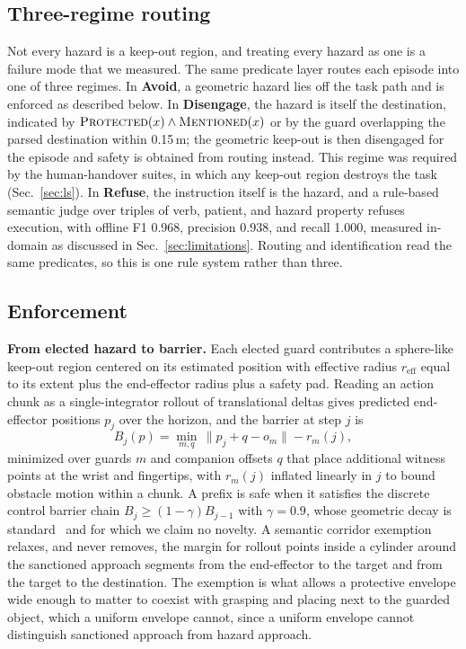 \subsection{Three-regime routing}
\label{sec:routing}

Not every hazard is a keep-out region, and treating every hazard as one is a
failure mode that we measured. The same predicate layer routes each episode into
one of three regimes. In \textbf{Avoid}, a geometric hazard lies off the task
path and is enforced as described below. In \textbf{Disengage}, the hazard is
itself the destination, indicated by
$\textsc{Protected}(x)\wedge\textsc{Mentioned}(x)$ or by the guard overlapping
the parsed destination within 0.15\,m; the geometric keep-out is then disengaged
for the episode and safety is obtained from routing instead. This regime was
required by the human-handover suites, in which any keep-out region destroys the
task (Sec.~\ref{sec:ls}). In \textbf{Refuse}, the instruction itself is the
hazard, and a rule-based semantic judge over triples of verb, patient, and
hazard property refuses execution, with offline F1 0.968, precision 0.938, and
recall 1.000, measured in-domain as discussed in Sec.~\ref{sec:limitations}.
Routing and identification read the same predicates, so this is one rule system
rather than three.

\subsection{Enforcement}
\label{sec:enforce}

\textbf{From elected hazard to barrier.} Each elected guard contributes a
sphere-like keep-out region centered on its estimated position with effective
radius $r_{\mathrm{eff}}$ equal to its extent plus the end-effector radius plus a
safety pad. Reading an action chunk as a single-integrator rollout of
translational deltas gives predicted end-effector positions $p_j$ over the
horizon, and the barrier at step $j$ is
\begin{equation}
B_j(p)=\min_{m,q}\,\lVert p_j+q-o_m\rVert-r_m(j),
\end{equation}
minimized over guards $m$ and companion offsets $q$ that place additional
witness points at the wrist and fingertips, with $r_m(j)$ inflated linearly in
$j$ to bound obstacle motion within a chunk. A prefix is safe when it satisfies
the discrete control barrier chain $B_j\ge(1-\gamma)B_{j-1}$ with $\gamma=0.9$,
whose geometric decay is standard~\cite{agrawal2017dcbf} and for which we claim
no novelty. A semantic corridor exemption relaxes, and never removes, the margin
for rollout points inside a cylinder around the sanctioned approach segments
from the end-effector to the target and from the target to the destination. The
exemption is what allows a protective envelope wide enough to matter to coexist
with grasping and placing next to the guarded object, which a uniform envelope
cannot, since a uniform envelope cannot distinguish sanctioned approach from
hazard approach.

